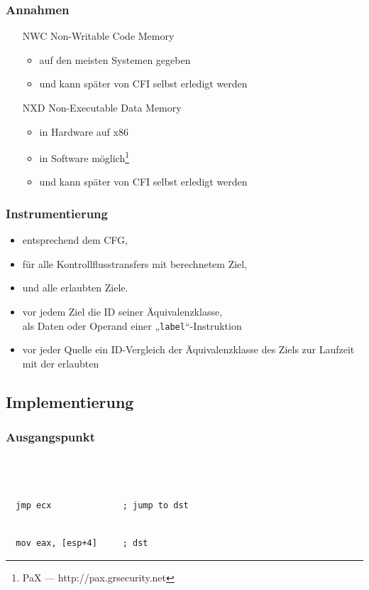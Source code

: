 \documentclass[mathserif,slidestop,compress,red]{beamer}
\begin{document}
\begin{frame}
  \frametitle{Annahmen}
  \begin{itemize}
    \item[NWC] Non-Writable Code Memory
    \begin{itemize}
      \item auf den meisten Systemen gegeben
      \pause
      \item und kann später von CFI selbst erledigt werden
    \end{itemize}
    \pause
    \item[NXD] Non-Executable Data Memory
    \begin{itemize}
      \item in Hardware auf x86
      \item in Software möglich\footnote<3->{PaX — http://pax.grsecurity.net}
      \pause
      \item und kann später von CFI selbst erledigt werden
    \end{itemize}
  \end{itemize}
\end{frame}

\begin{frame}
  \frametitle{Instrumentierung}
  \begin{itemize}
    \item entsprechend dem CFG,
    \item für alle Kontrollflusstransfers mit berechnetem Ziel,
    \item und alle erlaubten Ziele.
    \pause
    \vspace{1em}
    \item vor jedem Ziel die ID seiner Äquivalenzklasse,\\ als Daten
    oder Operand einer „\texttt{label}“-Instruktion
    \item vor jeder Quelle ein ID-Vergleich der Äquivalenzklasse des
    Ziels zur Laufzeit mit der erlaubten
  \end{itemize}
\end{frame}

\subsection{Implementierung}

\begin{frame}[fragile]
  \frametitle{Ausgangspunkt}
  \begin{lstlisting}[title=Quelle]



  jmp ecx              ; jump to dst
  \end{lstlisting}
  \begin{lstlisting}[title=Ziel]

  mov eax, [esp+4]     ; dst
  \end{lstlisting}
\end{frame}
\end{document}
